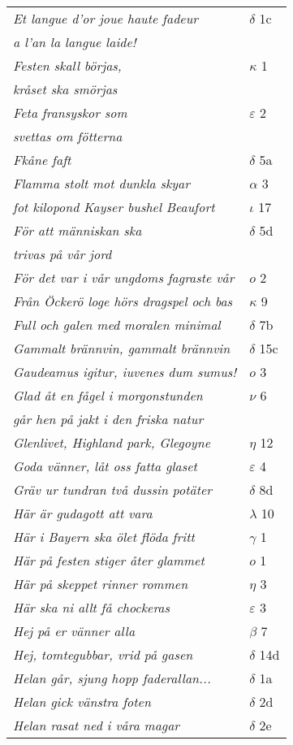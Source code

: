 \documentclass[a6paper,10pt]{article}
\begin{document}
\newpage
\begin{table}[!h]
\begin{tabular}{l l}
\textit{Et langue d'or joue haute fadeur}	&$\delta$ 1c\\
\textit{a l'an la langue laide!} &\\
\textit{Festen skall börjas,}	&$\kappa$ 1\\
\textit{kråset ska smörjas} &\\
\textit{Feta fransyskor som}	&$\varepsilon$ 2\\
\textit{svettas om fötterna} &\\
\textit{Fkåne faft}	&$\delta$ 5a\\
\textit{Flamma stolt mot dunkla skyar}	&$\alpha$ 3\\
\textit{fot kilopond Kayser bushel Beaufort}	&$\iota$ 17\\
\textit{För att människan ska}	&$\delta$ 5d\\
\textit{trivas på vår jord} &\\
\textit{För det var i vår ungdoms fagraste vår}	&$o$ 2\\
\textit{Från Öckerö loge hörs dragspel och bas}	&$\kappa$ 9\\
\textit{Full och galen med moralen minimal}	&$\delta$ 7b\\
\textit{Gammalt brännvin, gammalt brännvin}	&$\delta$ 15c\\
\textit{Gaudeamus igitur, iuvenes dum sumus!}	&$o$ 3\\
\textit{Glad åt en fågel i morgonstunden}	&$\nu$ 6\\
\textit{går hen på jakt i den friska natur} &\\
\textit{Glenlivet, Highland park, Glegoyne}	&$\eta$ 12\\
\textit{Goda vänner, låt oss fatta glaset}	&$\varepsilon$ 4\\
\textit{Gräv ur tundran två dussin potäter}	&$\delta$ 8d\\
\textit{Här är gudagott att vara}	&$\lambda$ 10\\
\textit{Här i Bayern ska ölet flöda fritt}	&$\gamma$ 1\\
\textit{Här på festen stiger åter glammet}	&$o$ 1\\
\textit{Här på skeppet rinner rommen}	&$\eta$ 3\\
\textit{Här ska ni allt få chockeras}	&$\varepsilon$ 3\\
\textit{Hej på er vänner alla}	&$\beta$ 7\\
\textit{Hej, tomtegubbar, vrid på gasen}	&$\delta$ 14d\\
\textit{Helan går, sjung hopp faderallan...}	&$\delta$ 1a\\
\textit{Helan gick  vänstra foten}	&$\delta$ 2d\\
\textit{Helan rasat ned i våra magar}	&$\delta$ 2e\\
\end{tabular}
\end{table}
\end{document}
